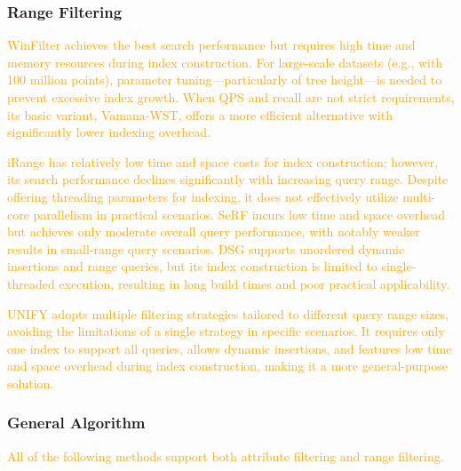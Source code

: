 \documentclass[sigconf, nonacm]{acmart}
\begin{document}
{	\subsubsection{\textbf{Range Filtering}}
\textcolor{orange}{
	WinFilter achieves the best search performance but requires high time and memory resources during index construction. For large-scale datasets (e.g., with 100 million points), parameter tuning—particularly of tree height—is needed to prevent excessive index growth. When QPS and recall are not strict requirements, its basic variant, Vamana-WST, offers a more efficient alternative with significantly lower indexing overhead.
		}
	
	\textcolor{orange}{
	iRange has relatively low time and space costs for index construction; however, its search performance declines significantly with increasing query range. Despite offering threading parameters for indexing, it does not effectively utilize multi-core parallelism in practical scenarios.
	SeRF incurs low time and space overhead but achieves only moderate overall query performance, with notably weaker results in small-range query scenarios.
	DSG supports unordered dynamic insertions and range queries, but its index construction is limited to single-threaded execution, resulting in long build times and poor practical applicability.}
	
		\textcolor{orange}{
	UNIFY adopts multiple filtering strategies tailored to different query range sizes, avoiding the limitations of a single strategy in specific scenarios. It requires only one index to support all queries, allows dynamic insertions, and features low time and space overhead during index construction, making it a more general-purpose solution.}

	\subsubsection{\textbf{General Algorithm}}
\textcolor{orange}{All of the following methods support both attribute filtering and range filtering.}

}
\end{document}
